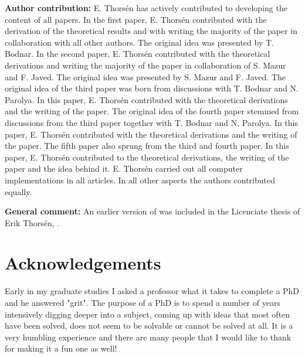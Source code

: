 \documentclass[12pt, oneside]{book}\usepackage{knitr}
\begin{document}
{\printbibliography[keyword={included_in_thesis}, title={Papers included in this thesis}, heading=subbibliography]

\textbf{Author contribution:} 
E. Thors\'en has actively contributed to developing the content of all papers.
In the first paper, E. Thors\'en contributed with the derivation of the theoretical results and with writing the majority of the paper in collaboration with all other authors. The original idea was presented by T. Bodnar.
In the second paper, E. Thors\'en contributed with the theoretical derivations and writing the majority of the paper in collaboration of S. Mazur and F. Javed. The original idea was presented by S. Mazur and F. Javed.
The original idea of the third paper was born from discussions with T. Bodnar and N. Parolya. 
In this paper, E. Thors\'en contributed with the theoretical derivations and the writing of the paper.
The original idea of the fourth paper stemmed from discussions from the third paper together with T. Bodnar and N. Parolya.
In this paper, E. Thors\'en contributed with the theoretical derivations and the writing of the paper.
The fifth paper also sprung from the third and fourth paper. 
In this paper, E. Thors\'en contributed to the theoretical derivations, the writing of the paper and the idea behind it.
E. Thorsén carried out all computer implementations in all articles.
In all other aspects the authors contributed equally.

\textbf{General comment:} An earlier version of \citet{bodnar2020sampling} was included in the Licenciate thesis of Erik Thors\'en, \citet{thorsen2019assessment}. 

\printbibliography[keyword={papers_list}, heading=subsubbibliography]

\chapter*{Acknowledgements}

Early in my graduate studies I asked a professor what it takes to complete a PhD and he answered "grit".
The purpose of a PhD is to spend a number of years intensively digging deeper into a subject, coming up with ideas that most often have been solved, does not seem to be solvable or cannot be solved at all.
It is a very humbling experience and there are many people that I would like to thank for making it a fun one as well!

}
\end{document}
